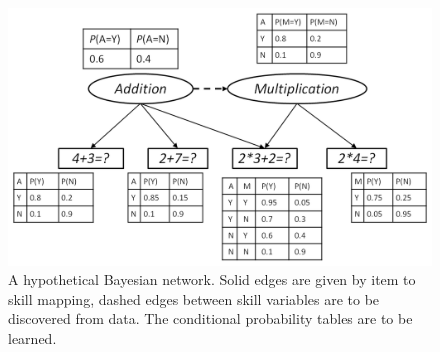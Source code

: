 \documentclass{edm_template}
\newcommand{\hl}[1]{\colorbox{yellow}{#1}}
\begin{document}

\begin{figure}
	\begin{center}
		\includegraphics[width=.90\linewidth]{figures/studentmodel.png}
	\end{center}
	\caption{A hypothetical Bayesian network. %
		Solid edges are given by item to skill mapping, dashed edges between skill variables are to be discovered from data.
		The conditional probability tables are to be learned.}
	\label{fig:smexample} 
\end{figure} 
\end{document}
